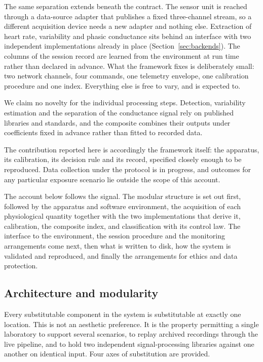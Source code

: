 The same separation extends beneath the contract. The sensor unit
is reached through a data-source adapter that publishes a fixed
three-channel stream, so a different acquisition device needs a
new adapter and nothing else. Extraction of heart rate,
variability and phasic conductance sits behind an interface with
two independent implementations already in place
(Section~\ref{sec:backends}). The columns of the session record
are learned from the environment at run time rather than declared
in advance. What the framework fixes is deliberately small: two
network channels, four commands, one telemetry envelope, one
calibration procedure and one index. Everything else is free to
vary, and is expected to.

We claim no novelty for the individual processing steps.
Detection, variability estimation and the separation of the
conductance signal rely on published libraries and standards, and
the composite combines their outputs under coefficients fixed in
advance rather than fitted to recorded data.

The contribution reported here is accordingly the framework
itself: the apparatus, its calibration, its decision rule and its
record, specified closely enough to be reproduced. Data collection
under the protocol is in progress, and outcomes for any particular
exposure scenario lie outside the scope of this account.

The account below follows the signal. The modular structure is
set out first, followed by the apparatus and software environment,
the acquisition of each physiological quantity together with the
two implementations that derive it, calibration, the composite
index, and classification with its control law. The interface to
the environment, the session procedure and the monitoring
arrangements come next, then what is written to disk, how the
system is validated and reproduced, and finally the arrangements
for ethics and data protection.

\subsection{Architecture and modularity}
\label{sec:modularity}

Every substitutable component in the system is substitutable at
exactly one location. This is not an aesthetic preference. It is
the property permitting a single laboratory to support several
scenarios, to replay archived recordings through the live
pipeline, and to hold two independent signal-processing libraries
against one another on identical input. Four axes of substitution
are provided.

